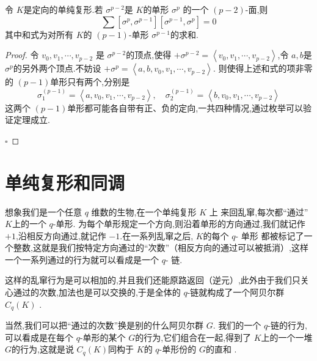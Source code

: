\documentclass[../../几何与拓扑.tex]{subfiles}
\begin{document}
    \begin{theorem}\label{thm:p-(p-1)-incidence}
        令 \(  K  \)是定向的单纯复形.若 \(   \sigma ^{p-2}  \)是 \(  K  \)的单形 \(   \sigma ^{p}  \)    的一个 \(  \left( p-2 \right)   \)-面,则 \[
        \sum [ \sigma ^{p}, \sigma ^{p-1}][ \sigma ^{p-1}, \sigma ^{p}] =  0
        \]  其中和式为对所有 \(  K  \)的 \(  \left( p-1 \right)   \)-单形  \(   \sigma ^{p-1}  \)的求和.   
    \end{theorem}

    \begin{proof}
    
        令 \(   v_0,v_1,\cdots,v_{p-2}   \) 是 \(   \sigma ^{p-2}  \)的顶点,使得 \(  +  \sigma ^{p-2}=  \left< v_0,v_1,\cdots,v_{p-2}  \right>  \),令 \(  a,b  \)是 \(   \sigma ^{p}  \)的另外两个顶点.不妨设 \(  +  \sigma ^{p} =  \left<a,b,  v_0,v_1,\cdots,v_{p-2}  \right>  \).
        则使得上述和式的项非零的 \(  \left( p-1 \right)   \)单形只有两个,分别是 \[
         \sigma _1 ^{\left( p-1 \right) } =  \left<a, v_0,v_1,\cdots,v_{p-2}  \right>,\quad   \sigma _2 ^{\left( p-1 \right) } =  \left<b,  v_0,v_1,\cdots,v_{p-2}  \right>
        \]这两个 \(  \left( p-1 \right)   \)单形都可能各自带有正、负的定向,一共四种情况,通过枚举可以验证定理成立.       
    
        \hfill $\square$
    \end{proof}


\section{单纯复形和同调}

想象我们是一个任意 \(  q  \) 维数的生物,在一个单纯复形 \(  K  \) 上 来回乱窜,每次都“通过” \(  K  \)上的一个 \(  q  \)-单形. 
为每个单形规定一个方向,则沿着单形的方向通过,我们就记作 \(  + 1  \),沿相反方向通过,就记作 \(  -1  \).在一系列乱窜之后, \(  K  \)的每个 \(  q  \)- 单形
都被标记了一个整数,这就是我们按特定方向通过的“次数”（相反方向的通过可以被抵消）,这样一个一系列通过的行为就可以看成是一个 \(  q  \)- 链.  

这样的乱窜行为是可以相加的,并且我们还能原路返回（逆元）,此外由于我们只关心通过的次数,加法也是可以交换的,于是全体的 \(  q  \)-链就构成了一个阿贝尔群 \(  C_{q}\left( K \right)   \) . 

当然,我们可以把“通过的次数”换是别的什么阿贝尔群 \(  G  \). 我们的一个 \(  q  \)-链的行为,可以看成是在每个 \(  q  \)-单形的某个 \(  G  \)的行为,它们组合在一起,得到了 \(  K  \)上的一个一堆 \(  G  \)的行为,这就是说 \(  C_{q}\left( K \right)   \)同构于 \(  K  \)的 \(  q  \)-单形份的 \(  G  \)的直和    .     
\end{document}
